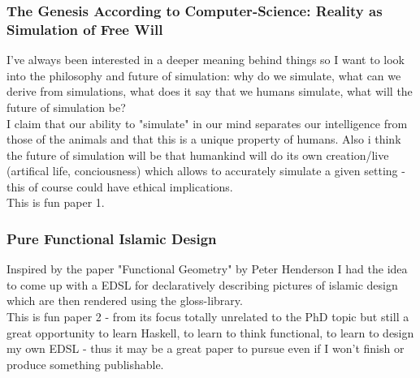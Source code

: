 \subsubsection{The Genesis According to Computer-Science: Reality as Simulation of Free Will}
I've always been interested in a deeper meaning behind things so I want to look into the philosophy and future of simulation: why do we simulate, what can we derive from simulations, what does it say that we humans simulate, what will the future of simulation be? \\
I claim that our ability to "simulate" in our mind separates our intelligence from those of the animals and that this is a unique property of humans. Also i think the future of simulation will be that humankind will do its own creation/live (artifical life, conciousness) which allows to accurately simulate a given setting - this of course could have ethical implications. \\
This is fun paper 1.

\subsubsection{Pure Functional Islamic Design}
Inspired by the paper "Functional Geometry" by Peter Henderson I had the idea to come up with a  EDSL for declaratively describing pictures of islamic design which are then rendered using the gloss-library. \\
This is fun paper 2 - from its focus totally unrelated to the PhD topic but still a great opportunity to learn Haskell, to learn to think functional, to learn to design my own EDSL - thus it may be a great paper to pursue even if I won't finish or produce something publishable.

